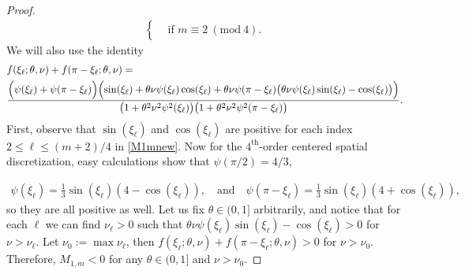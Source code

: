 \documentclass[smallextended,numbook,runningheads]{svjour3}     %
\newcommand{\Mod}[1]{\ (\mathrm{mod}\ #1)}
\begin{document}
\begin{description}[style=unboxed,leftmargin=0cm]
\begin{proof}
\begin{align}
\begin{cases}
								& \text{if } m \equiv 2 \Mod{4}.
						\end{cases}
	\end{align}
	We will also use the identity
	\begin{align*}
		&f(\xi_\ell; \theta, \nu) + f(\pi-\xi_\ell; \theta, \nu) = \\
			&\frac{\Bigl(\psi(\xi_\ell) + \psi(\pi-\xi_\ell)\Bigr)
			\Bigl(\sin(\xi_\ell) + \theta\nu\psi(\xi_\ell)\cos(\xi_\ell) +
			\theta\nu\psi(\pi-\xi_\ell)\bigl(\theta\nu\psi(\xi_\ell)\sin(\xi_\ell)-\cos(\xi_\ell)\bigr)\Bigr)}
				{\bigl(1+\theta^2\nu^2\psi^2(\xi_\ell)\bigr)\bigl(1+\theta^2\nu^2\psi^2(\pi-\xi_\ell)\bigr)}.
	\end{align*}
	First, observe that $\sin(\xi_\ell)$ and $\cos(\xi_\ell)$ are positive for each index $2 \le \ell \le (m+2)/4$ in
	\eqref{M1mnew}. Now for the $4^\text{th}$-order centered spatial discretization, easy calculations show that $\psi(\pi/2) = 4/3$,
	
	\begin{align*}
		\psi(\xi_\ell) = \frac{1}{3}\sin(\xi_\ell)(4 - \cos(\xi_\ell)), \quad \text{and} \quad
		\psi(\pi - \xi_\ell) = \frac{1}{3}\sin(\xi_\ell)(4 + \cos(\xi_\ell)),
	\end{align*}
	so they are all positive as well. Let us fix $\theta \in (0,1]$ arbitrarily, and notice that for each $\ell$ we can find $\nu_\ell > 0$ such that
	$\theta\nu\psi(\xi_\ell)\sin(\xi_\ell)-\cos(\xi_\ell)>0$ for $\nu>\nu_\ell$. Let $\nu_0:=\max \nu_\ell$, then  
	$f(\xi_\ell; \theta, \nu) + f(\pi-\xi_\ell; \theta, \nu)>0$ for $\nu>\nu_0$. Therefore, $M_{1,m} < 0$ for any $\theta \in (0,1]$ and $\nu>\nu_0$.


\end{proof}
\end{description}
\end{document}
